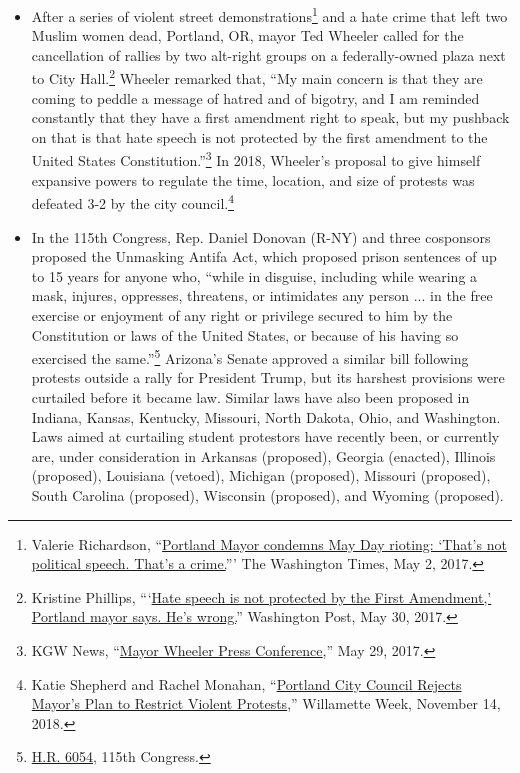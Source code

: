 \documentclass[12pt]{article}
\begin{document}
\begin{itemize}
\item After a series of violent street demonstrations\footnote{Valerie Richardson, ``\href{https://www.washingtontimes.com/news/2017/may/2/ted-wheeler-condemns-portland-may-day-rioting-25-a/}{Portland Mayor condemns May Day rioting: `That's not political speech. That's a crime.}''' The Washington Times, May 2, 2017.} and a hate crime that left two Muslim women dead, Portland, OR, mayor Ted Wheeler called for the cancellation of rallies by two alt-right groups on a federally-owned plaza next to City Hall.\footnote{Kristine Phillips, ``‘\href{https://www.washingtonpost.com/news/the-fix/wp/2017/05/30/hate-speech-is-not-protected-by-the-first-amendment-oregon-mayor-says-hes-wrong/?utm_term=.238e1453bc6d}{Hate speech is not protected by the First Amendment,’ Portland mayor says. He’s wrong.}'' Washington Post, May 30, 2017.} Wheeler remarked that, ``My main concern is that they are coming to peddle a message of hatred and of bigotry, and I am reminded constantly that they have a first amendment right to speak, but my pushback on that is that hate speech is not protected by the first amendment to the United States Constitution.''\footnote{KGW News, ``\href{https://www.facebook.com/KGWTV8/videos/10154418822720736/}{Mayor Wheeler Press Conference},'' May 29, 2017.} In 2018, Wheeler's proposal to give himself expansive powers to regulate the time, location, and size of protests was defeated 3-2 by the city council.\footnote{Katie Shepherd and Rachel Monahan, ``\href{https://www.wweek.com/news/city/2018/11/14/portland-city-council-rejects-mayors-plan-to-restrict-violent-protests/}{Portland City Council Rejects Mayor's Plan to Restrict Violent Protests},'' Willamette Week, November 14, 2018.}
\item In the 115th Congress, Rep. Daniel Donovan (R-NY) and three cosponsors proposed the Unmasking Antifa Act, which proposed prison sentences of up to 15 years for anyone who, ``while in disguise, including while wearing a mask, injures, oppresses, threatens, or intimidates any person ... in the free exercise or enjoyment of any right or privilege secured to him by the Constitution or laws of the United States, or because of his having so exercised the same.''\footnote{\href{https://www.congress.gov/bill/115th-congress/house-bill/6054/text}{H.R. 6054}, 115th Congress.} Arizona's Senate approved a similar bill following protests outside a rally for President Trump, but its harshest provisions were curtailed before it became law. Similar laws have also been proposed in Indiana, Kansas, Kentucky, Missouri, North Dakota, Ohio, and Washington. Laws aimed at curtailing student protestors have recently been, or currently are, under consideration in Arkansas (proposed), Georgia (enacted), Illinois (proposed), Louisiana (vetoed), Michigan (proposed), Missouri (proposed), South Carolina (proposed), Wisconsin (proposed), and Wyoming (proposed).
\end{itemize}
\end{document}
